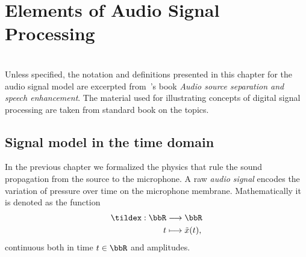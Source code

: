 \chapter{Elements of Audio Signal Processing}\label{ch:processing}
\vspace{-2.5em}
\synopsisChProcessing
\\Unless specified, the notation and definitions presented in this chapter for the audio signal model are excerpted from~\citeauthor{vincent2018audio}'s book \textit{Audio source separation and speech enhancement}.
The material used for illustrating concepts of digital signal processing are taken from standard book on the topics.

\section{Signal model in the time domain}\label{sec:processing:model}
In the previous chapter we formalized the physics that rule the sound propagation from the source to the microphone.
A raw \textit{audio signal} encodes the variation of pressure over time on the microphone membrane.
Mathematically it is denoted as the function
\begin{equation}
    \begin{aligned}
        \tildex : \bbR &\kto \bbR\\
                     t &\kmapsto \tilde{x}(t),
    \end{aligned}
\end{equation}
continuous both in time $t \in \R$ and amplitudes.

